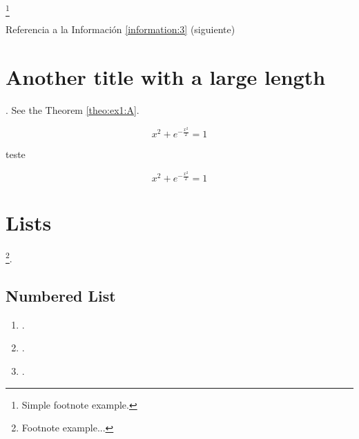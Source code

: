 \lipsum[1] %

\begin{attentionbox}
\label{attentionbox:a}
\lipsum[1][1-3]\footnote{Simple footnote example.}
\end{attentionbox}

\lipsum[1] %

Referencia a la Información \ref{information:3} (siguiente)

\begin{elaborationbox}[Título C]
\label{information:3}
\lipsum[1][1-3] 
\end{elaborationbox}

\lipsum[1] %

\section{Another title with a large length}

\lipsum[1]. See the Theorem \ref{theo:ex1:A}.

\begin{theorem}
\label{theo:ex1:A}
\lipsum[1][1-3]
\begin{equation}
x^2+e^{-\frac{x^2}{2}}=1
\end{equation}
\end{theorem}

teste

\begin{proofraw}
\lipsum[1][1-3]
\begin{equation}
x^2+e^{-\frac{x^2}{2}}=1
\end{equation}
\end{proofraw}
\section{Lists}

\lipsum[1][1-3]\footnote{Footnote example...}.

\subsection{Numbered List}

\begin{enumerate}
\item \lipsum[1][1-3].
\item \lipsum[1][1-3].
\item \lipsum[1][1-3].
\end{enumerate}

